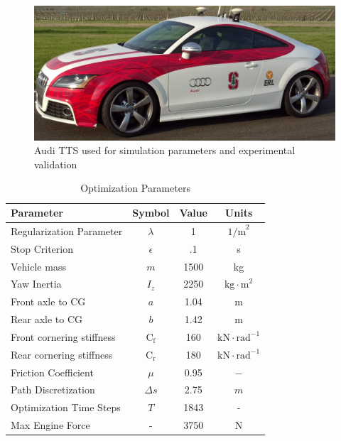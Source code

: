 \documentclass[twocolumn,10pt]{asme2ej}
\begin{document}
 \begin{figure}
\centering
\includegraphics[width=3.5 in]{figures/shelleyPic.jpg}
\caption{Audi TTS used for simulation parameters and experimental validation}
\label{fig:shelleyPic}
\end{figure}

\begin{table}[h]
\begin{center}
\small
\caption{Optimization Parameters}\label{tb:params}
\begin{tabular}{lccc}
Parameter & Symbol & Value & Units \\\hline
Regularization Parameter & $\lambda$ & 1 & $\mathrm{1/m}^2$\\
Stop Criterion           & $\epsilon $ & .1 & s \\
Vehicle mass & $m$ & 1500 & kg \\
Yaw Inertia & $I_z$ & 2250 & $\mathrm{kg \cdot m}^2$\\
Front axle to CG & $a$ & 1.04 & m\\
Rear axle to CG & $b$ & 1.42 & m\\
Front cornering stiffness & $\mathrm{C}_\mathrm{f}$ & 160 & $\mathrm{kN \cdot rad}^{-1}$ \\
Rear cornering stiffness & $\mathrm{C}_\mathrm{r}$ & 180 & $\mathrm{kN \cdot rad}^{-1}$ \\
Friction Coefficient     & $\mu $                  &  0.95 & $\mathrm{-} $ \\
Path Discretization      & $\Delta s$              & 2.75 & $m$\\
Optimization Time Steps  & $T       $              & 1843 & -  \\
Max Engine Force         & -                       & 3750 & N\\\hline
\end{tabular}
\end{center}
\end{table}
\end{document}

